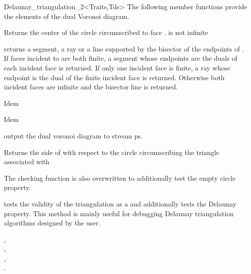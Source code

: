 \begin{ccRefClass}{Delaunay_triangulation_2<Traits,Tds>}
The following member functions provide the elements of the
dual Voronoi diagram.

{Returns the center of the circle circumscribed to face .
\ccPrecond {} is not infinite}

{returns a segment, a ray or a line supported by the bisector of the
endpoints of .
If faces incident to  are both finite, a segment whose endpoints are the
duals of each incident face is returned. If only one incident face is
finite, a
ray whose endpoint is the dual of the finite incident face is returned.
Otherwise both incident faces
are infinite and the bisector line is returned.}

{Idem}

{Idem}

{output the dual voronoi diagram to stream ps.}


\ccPredicates
{}
\ccThreeToTwo

{Returns the side of  with respect to the circle circumscribing
 the triangle associated with }

\begin{ccAdvanced}

The checking function  is also overwritten
to additionally test the empty circle property.

{ tests the validity of the triangulation as a 
and additionally tests the Delaunay property. This method is
 mainly  useful for debugging Delaunay triangulation algorithms designed by
 the user.}
\end{ccAdvanced}




\ccSeeAlso

, \\
, \\
, \\
.





\end{ccRefClass}
